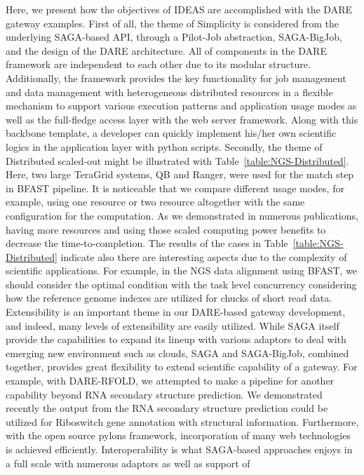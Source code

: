 \documentclass{sig-alternate}
\begin{document}
  
  Here, we present how the objectives of IDEAS are
accomplished with the DARE gateway examples.  First of all, the theme
of Simplicity is considered from the underlying SAGA-based API,
through a Pilot-Job abstraction, SAGA-BigJob, and the design of the
DARE architecture.  All of components in the DARE framework are
independent to each other due to its modular structure.  Additionally,
the framework provides the key functionality for job management and
data management with heterogeneous distributed resources in a flexible
mechanism to support various execution patterns and application usage
modes as well as the full-fledge access layer with the web server
framework.  Along with this backbone template, a developer can quickly
implement his/her own scientific logics in the application layer with
python scripts.  Secondly, the theme of Distributed scaled-out might
be illustrated with Table~\ref{table:NGS-Distributed}.  Here, two
large TeraGrid systems, QB and Ranger, were used for the match step in
BFAST pipeline.  It is noticeable that we compare different usage
modes, for example, using one resource or two resource altogether with
the same configuration for the computation.  As we demonstrated in
numerous publications, having more resources and using those scaled
computing power benefits to decrease the time-to-completion.  The
results of the cases in Table~\ref{table:NGS-Distributed} indicate
also there are interesting aspects due to the complexity of scientific
applications.  For example, in the NGS data alignment using BFAST, we
should consider the optimal condition with the task level concurrency
considering how the reference genome indexes are utilized for chucks
of short read data\cite{ecmls11}.  Extensibility is an important theme
in our DARE-based gateway development, and indeed, many levels of
extensibility are easily utilized.  While SAGA itself provide the
capabilities to expand its lineup with various adaptors to deal with
emerging new environment such as clouds, SAGA and SAGA-BigJob,
combined together, provides great flexibility to extend scientific
capability of a gateway. For example, with DARE-RFOLD, we attempted to
make a pipeline for another capability beyond RNA secondary structure
prediction.  We demonstrated recently the output from the RNA
secondary structure prediction could be utilized for Riboswitch gene
annotation with structural information.  Furthermore, with the open
source pylons framework, incorporation of many web technologies is
achieved efficiently.  Interoperability is what SAGA-based approaches
enjoys in a full scale with numerous adaptors as well as support of
\end{document}

